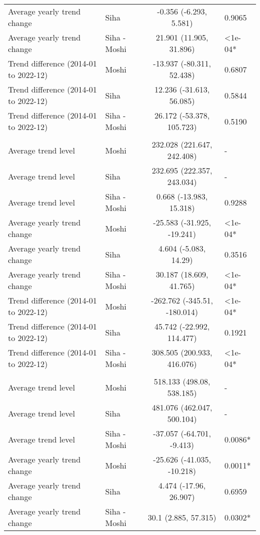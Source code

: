 \begin{longtable}{l|lcl}
Average yearly trend change & Siha & -0.356 (-6.293, 5.581) & 0.9065 \\ 
Average yearly trend change & Siha - Moshi & 21.901 (11.905, 31.896) & <1e-04* \\ 
Trend difference (2014-01 to 2022-12) & Moshi & -13.937 (-80.311, 52.438) & 0.6807 \\ 
Trend difference (2014-01 to 2022-12) & Siha & 12.236 (-31.613, 56.085) & 0.5844 \\ 
Trend difference (2014-01 to 2022-12) & Siha - Moshi & 26.172 (-53.378, 105.723) & 0.5190 \\ 
\midrule\addlinespace[2.5pt]
\multicolumn{4}{l}{Other Communicable Diseases} \\ 
\midrule\addlinespace[2.5pt]
Average trend level & Moshi & 232.028 (221.647, 242.408) & - \\ 
Average trend level & Siha & 232.695 (222.357, 243.034) & - \\ 
Average trend level & Siha - Moshi & 0.668 (-13.983, 15.318) & 0.9288 \\ 
Average yearly trend change & Moshi & -25.583 (-31.925, -19.241) & <1e-04* \\ 
Average yearly trend change & Siha & 4.604 (-5.083, 14.29) & 0.3516 \\ 
Average yearly trend change & Siha - Moshi & 30.187 (18.609, 41.765) & <1e-04* \\ 
Trend difference (2014-01 to 2022-12) & Moshi & -262.762 (-345.51, -180.014) & <1e-04* \\ 
Trend difference (2014-01 to 2022-12) & Siha & 45.742 (-22.992, 114.477) & 0.1921 \\ 
Trend difference (2014-01 to 2022-12) & Siha - Moshi & 308.505 (200.933, 416.076) & <1e-04* \\ 
\midrule\addlinespace[2.5pt]
\multicolumn{4}{l}{Other Non-Communicable} \\ 
\midrule\addlinespace[2.5pt]
Average trend level & Moshi & 518.133 (498.08, 538.185) & - \\ 
Average trend level & Siha & 481.076 (462.047, 500.104) & - \\ 
Average trend level & Siha - Moshi & -37.057 (-64.701, -9.413) & 0.0086* \\ 
Average yearly trend change & Moshi & -25.626 (-41.035, -10.218) & 0.0011* \\ 
Average yearly trend change & Siha & 4.474 (-17.96, 26.907) & 0.6959 \\ 
Average yearly trend change & Siha - Moshi & 30.1 (2.885, 57.315) & 0.0302* \\ 

\end{longtable}
